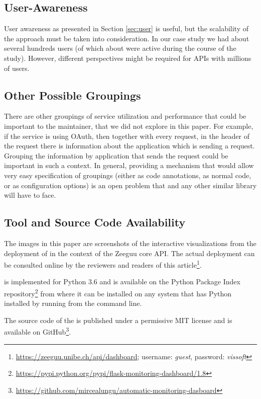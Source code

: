 \documentclass[conference]{IEEEtran}
\begin{document}
  \subsection{User-Awareness }

    User awareness as presented in Section \ref{sec:user} is useful, but the scalability of the approach must be taken into consideration. In our case study we had about several hundreds users (of which about \activeUserCount were active during the course of the study). However, different perspectives might be required for APIs with millions of users.


  \subsection{Other Possible Groupings}

    There are other groupings of service utilization and performance that could be important to the maintainer, that we did not explore in this paper. For example, if the service is using OAuth, then together with every request, in the header of the request there is information about the application which is sending a request. Grouping the information by application that sends the request could be important in such a context. In general, providing a mechanism that would allow very easy specification of groupings (either as code annotations, as normal code, or as configuration options) is an open problem that \tool and any other similar library will have to face.

  \subsection{Tool and Source Code Availability}
  \label{sec:install}

    The images in this paper are screenshots of the interactive visualizations from the deployment of \tool in the context of the Zeeguu core API. The actual deployment can be consulted online by the reviewers and readers of this article\footnote{\url{https://zeeguu.unibe.ch/api/dashboard}; username: {\em guest}, password: {\em vissoft}}.

    \tool is implemented for Python 3.6 and is available on the Python Package Index repository\footnote{\url{https://pypi.python.org/pypi/flask-monitoring-dashboard/1.8}} from where it can be installed on any system that has Python installed by running \install from the command line. 

    The source code of the \tool is published under a permissive MIT license and is available on GitHub\footnote{\url{https://github.com/mircealungu/automatic-monitoring-dasboard}}.
\end{document}
